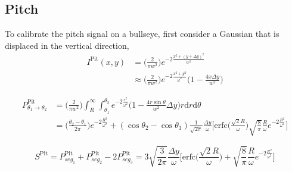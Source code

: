 \begin{appendices}
	\subsection{Pitch}
	To calibrate the pitch signal on a bullseye, first consider a Gaussian that is displaced in the vertical direction,
	\begin{equation}
	\begin{split}
	I^{\text{Pit}}(x,y) 	&= 			\bigg(\frac{2}{\pi w^2}\bigg) e^{-2 \frac{x^2 + (y+\Delta y)^2}{w^2}}\\
					&\approx	\bigg(\frac{2}{\pi w^2}\bigg) e^{-2 \frac{x^2 + y^2}{\omega^2}}  \bigg(1-\frac{4 x \Delta y}{w^2}\bigg)
	\end{split}
	\end{equation}

	\begin{equation}
	\begin{split}
	P^{\text{Pit}}_{\theta_1 \rightarrow \theta_2} 	&=  \bigg(\frac{2}{\pi w^2}\bigg) \int_{R}^{\infty} \int_{\theta_1}^{\theta_2} e^{-2 \frac{r^2}{\omega^2}}  \bigg(1-\frac{4 r \sin \theta}{w^2}\Delta y\bigg) r \text{d}r \text{d} \theta\\
		&= \bigg( \frac{\theta_2-\theta_1}{2 \pi}\bigg) e^{-2 \frac{R^2}{\omega^2}} + (\cos \theta_2 - \cos \theta_1) \frac{1}{\sqrt{2 \pi}} \frac{\Delta y}{\omega} \bigg[ 	  \text{erfc} \bigg(\frac{\sqrt{2} R}{\omega}\bigg) \sqrt{\frac{8}{\pi}} \frac{R}{\omega} e^{-2 \frac{R^2}{\omega^2}}\bigg]
	\end{split}
	\end{equation}
	
	\begin{equation}
	S^{\text{Pit}} = P^{\text{Pit}}_{seg_1} + P^{\text{Pit}}_{seg_2} - 2 P^{\text{Pit}}_{seg_3} = 3\sqrt{\frac{3}{2\pi}} \frac{\Delta y}{\omega} \bigg[ \text{erfc} \bigg(\frac{\sqrt{2} R}{\omega}\bigg) + \sqrt{\frac{8}{\pi }} \frac{R}{\omega} e^{-2 \frac{R^2}{\omega^2}} \bigg]
 	\end{equation}


\end{appendices}

